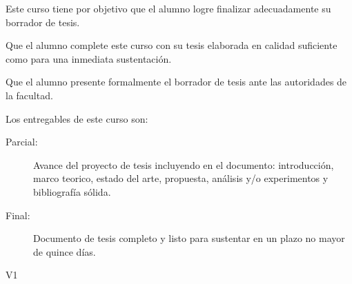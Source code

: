 \begin{syllabus}


\begin{justification}
Este curso tiene por objetivo que el alumno logre finalizar adecuadamente su borrador de tesis.
\end{justification}

\begin{goals}
\item Que el alumno complete este curso con su tesis elaborada en calidad suficiente como para una inmediata sustentación.
\item Que el alumno presente formalmente el borrador de tesis ante las autoridades de la facultad.
\item Los entregables de este curso son:
	\begin{description}
	\item [Parcial:] Avance del proyecto de tesis incluyendo en el documento: introducción, marco teorico, estado del arte, propuesta, análisis y/o experimentos y bibliografía sólida.
	\item [Final:] Documento de tesis completo y listo para sustentar en un plazo no mayor de quince días.
	\end{description}
\end{goals}

\begin{outcomes}{V1}
    \item {}
    \item {}
    \item {}
    \item {}
    \item {}
    \item {}
    \item {}
    \item {}
    \item {}
    \item {}
    \item {}
\end{outcomes}


\end{syllabus}
